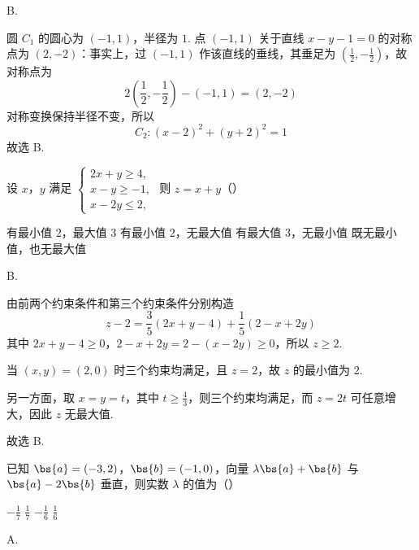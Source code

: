 \begin{answer}
B.
\end{answer}

\begin{solution}
圆 \(C_{1}\) 的圆心为 \((-1,1)\)，半径为 \(1\). 点 \((-1,1)\) 关于直线 \(x-y-1=0\) 的对称点为 \((2,-2)\)：事实上，过 \((-1,1)\) 作该直线的垂线，其垂足为 \(\left(\frac12,-\frac12\right)\)，故对称点为
\[
2\left(\frac12,-\frac12\right)-(-1,1)=(2,-2)
\]
对称变换保持半径不变，所以
\[
C_{2}:(x-2)^{2}+(y+2)^{2}=1
\]
故选 B.
\end{solution}

\begin{problem}
设 \(x\)，\(y\) 满足 \(\begin{cases}
2x + y \geqslant 4,\\
x - y \geqslant -1,\\
x - 2y \leqslant 2,
\end{cases}\) 则 \(z = x + y\)（\quad）

\choices
    {有最小值 \(2\)，最大值 \(3\)}
    {有最小值 \(2\)，无最大值}
    {有最大值 \(3\)，无最小值}
    {既无最小值，也无最大值}
\end{problem}

\begin{answer}
B.
\end{answer}

\begin{solution}
由前两个约束条件和第三个约束条件分别构造
\[
z-2=\frac35(2x+y-4)+\frac15(2-x+2y)
\]
其中 \(2x+y-4\geqslant0\)，\(2-x+2y=2-(x-2y)\geqslant0\)，所以 \(z\geqslant2\).

当 \((x,y)=(2,0)\) 时三个约束均满足，且 \(z=2\)，故 \(z\) 的最小值为 \(2\).

另一方面，取 \(x=y=t\)，其中 \(t\geqslant\frac43\)，则三个约束均满足，而 \(z=2t\) 可任意增大，因此 \(z\) 无最大值.

故选 B.
\end{solution}

\begin{problem}
已知 \(\bs{a} = (-3, 2)\)，\(\bs{b} = (-1, 0)\)，向量 \(\lambda \bs{a} + \bs{b}\) 与 \(\bs{a} - 2\bs{b}\) 垂直，则实数 \(\lambda\) 的值为（\quad）

\choices
    {\( -\frac{1}{7} \)}
    {\( \frac{1}{7} \)}
    {\(-\frac{1}{6}\)}
    {\( \frac{1}{6} \)}
\end{problem}

\begin{answer}
A.
\end{answer}

